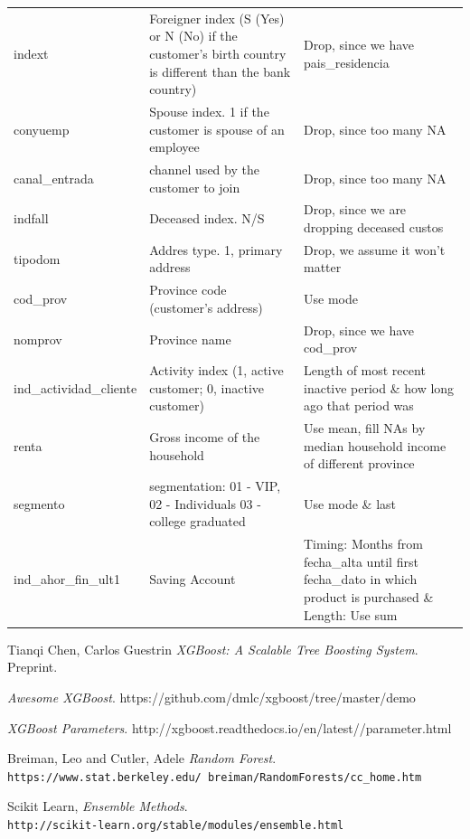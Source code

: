 \documentclass{article}
\begin{document}
\begin{spacing}{1}
\begin{large}
\begin{appendices}
\begin{longtable}{p{3cm}|p{5cm}|p{5cm}}
		indext & Foreigner index (S (Yes) or N (No) if the customer's birth country is different than the bank country) & Drop, since we have pais\_residencia \\
		conyuemp & Spouse index. 1 if the customer is spouse of an employee & Drop, since too many NA \\
		canal\_entrada & channel used by the customer to join & Drop, since too many NA \\
		indfall & Deceased index. N/S & Drop, since we are dropping deceased custos \\
		tipodom & Addres type. 1, primary address & Drop, we assume it won't matter \\
		cod\_prov & Province code (customer's address) & Use mode \\
		nomprov & Province name & Drop, since we have cod\_prov \\
		ind\_actividad\_cliente & Activity index (1, active customer; 0, inactive customer) & Length of most recent inactive period \& how long ago that period was \\
		renta & Gross income of the household & Use mean, fill NAs by median household income of different province \\
		segmento & segmentation: 01 - VIP, 02 - Individuals 03 - college graduated & Use mode \& last \\
		ind\_ahor\_fin\_ult1 & Saving Account & Timing: Months from fecha\_alta until first fecha\_dato in which product is purchased \& Length: Use sum \\
		
		
	\end{longtable}
	
\end{appendices}

\begin{thebibliography}{9}
	
	Tianqi Chen, Carlos Guestrin
	\emph{XGBoost: A Scalable Tree Boosting System}. Preprint.
	
	\emph{Awesome XGBoost}.
	https://github.com/dmlc/xgboost/tree/master/demo
	
	\emph{XGBoost Parameters}.
	http://xgboost.readthedocs.io/en/latest//parameter.html
	
	Breiman, Leo and Cutler, Adele
	\textit{Random Forest}.
	\\\texttt{https://www.stat.berkeley.edu/~breiman/RandomForests/cc\_home.htm}
	
	Scikit Learn,
	\textit{Ensemble Methods}.
	\\\texttt{http://scikit-learn.org/stable/modules/ensemble.html}
	

\end{thebibliography}
\end{large}
\end{spacing}
\end{document}
